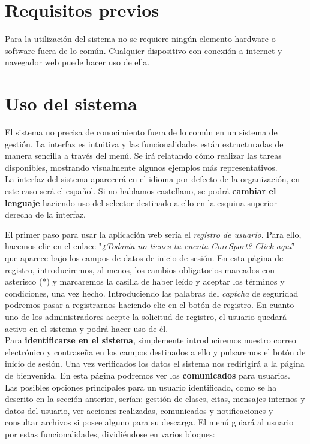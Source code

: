 \section{Requisitos previos}

Para la utilización del sistema no se requiere ningún elemento hardware o software fuera de lo común. Cualquier dispositivo con conexión a internet y navegador web puede hacer uso de ella. 


\section{Uso del sistema}

El sistema no precisa de conocimiento fuera de lo común en un sistema de gestión. La interfaz es intuitiva y las funcionalidades están estructuradas de manera sencilla a través del menú. Se irá relatando cómo realizar las tareas disponibles, mostrando visualmente algunos ejemplos más representativos. \\

La interfaz del sistema aparecerá en el idioma por defecto de la organización, en este caso será el español. Si no hablamos castellano, se podrá \textbf{cambiar el lenguaje} haciendo uso del selector destinado a ello en la esquina superior derecha de la interfaz.

El primer paso para usar la aplicación web sería el \textit{registro de usuario}. Para ello, hacemos clic en el enlace "\textit{¿Todavía no tienes tu cuenta CoreSport? Click aquí}" que aparece bajo los campos de datos de inicio de sesión. En esta página de registro, introduciremos, al menos, los cambios obligatorios marcados con asterisco (*) y marcaremos la casilla de haber leído y aceptar los términos y condiciones, una vez hecho. Introduciendo las palabras del \textit{captcha} de seguridad podremos pasar a registrarnos haciendo clic en el botón de registro. En cuanto uno de los administradores acepte la solicitud de registro, el usuario quedará activo en el sistema y podrá hacer uso de él. \\

Para \textbf{identificarse en el sistema}, simplemente introduciremos nuestro correo electrónico y contraseña en los campos destinados a ello y pulsaremos el botón de inicio de sesión. Una vez verificados los datos el sistema nos redirigirá a la página de bienvenida. En esta página podremos ver los \textbf{comunicados} para usuarios. \\

Las posibles opciones principales para un usuario identificado, como se ha descrito en la sección anterior, serían: gestión de clases, citas, mensajes internos y datos del usuario, ver acciones realizadas, comunicados y notificaciones y consultar archivos si posee alguno para su descarga. El menú guiará al usuario por estas funcionalidades, dividiéndose en varios bloques: 

